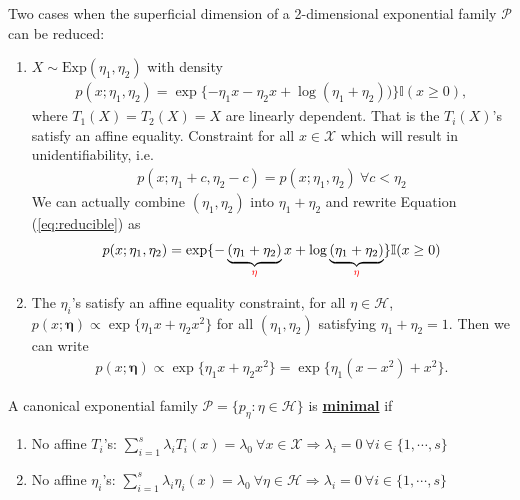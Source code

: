 \begin{note}
    Two cases when the superficial dimension of a 2-dimensional exponential family $\mathcal{P}$ can be reduced:
    \begin{enumerate}[{(1)}]
        \item $X\sim\text{Exp}(\eta_1,\eta_2)$ with density
        \begin{gather}
            p(x;\eta_1,\eta_2)=\exp\{-\eta_1x-\eta_2x+\log(\eta_1+\eta_2))\}\mathbb{I}(x\geq 0),\label{eq:reducible}
        \end{gather}
        where $T_1(X)=T_2(X)=X$ are linearly dependent. 
        That is the $T_i(X)$'s satisfy an affine equality. 
        Constraint for all $x\in\mathcal{X}$ which will result in unidentifiability, i.e.
        \begin{gather}
            p(x;\eta_1+c,\eta_2-c)=p(x;\eta_1,\eta_2)~\forall{c}<\eta_2
        \end{gather}
        We can actually combine $(\eta_1,\eta_2)$ into $\eta_1+\eta_2$ and rewrite Equation (\ref{eq:reducible}) as 
        \begin{gather}
            p(x;\eta_1,\eta_2)=\exp\{-\underbrace{(\eta_1+\eta_2)}_{\color{red}\eta}x
            +\log\underbrace{(\eta_1+\eta_2)}_{\color{red} \eta}\}\mathbb{I}(x\geq 0)
        \end{gather}
        \item The $\eta_i$'s satisfy an affine equality constraint, for all $\eta\in\mathcal{H}$,
        $p(x;\boldsymbol{\eta})\propto\exp\{\eta_1x+\eta_2x^2\}$ for all $(\eta_1,\eta_2)$ 
        satisfying $\eta_1+\eta_2=1$. 
        Then we can write 
        \begin{gather}
            p(x;\boldsymbol{\eta})\propto\exp\{\eta_1x+\eta_2x^2\}=\exp\{\eta_1(x-x^2)+x^2\}.
        \end{gather}
    \end{enumerate}
\end{note}

\begin{definition}[Minimal]
    A canonical exponential family $\mathcal{P}=\{p_\eta:\eta\in\mathcal{H}\}$ is \textbf{\underline{minimal}} if
    \begin{enumerate}[{(1)}]
        \item No affine $T_i$'s: 
        $\sum_{i=1}^s\lambda_iT_i(x)=\lambda_0~\forall{x}\in\mathcal{X}\Rightarrow\lambda_i=0~\forall{i}\in\{1,\cdots,s\}$
        \item No affine $\eta_i$'s: 
        $\sum_{i=1}^s\lambda_i\eta_i(x)=\lambda_0~\forall{\eta}\in\mathcal{H}\Rightarrow\lambda_i=0~\forall{i}\in\{1,\cdots,s\}$
    \end{enumerate}
\end{definition}

